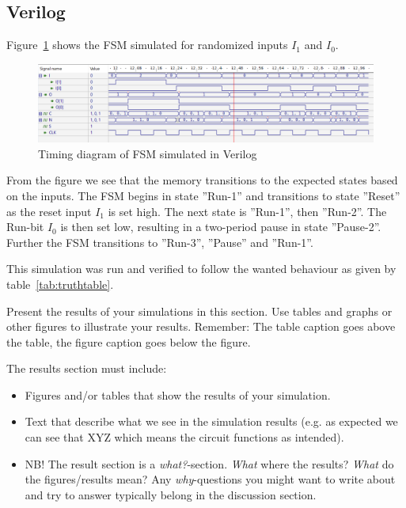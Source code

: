 \subsection{Verilog}

Figure~\ref{fig:fsm_simulation} shows the FSM simulated for randomized inputs $I_1$ and $I_0$.

\begin{figure}[H]
    \centering
    \includegraphics[width=\textwidth]{Figures/Test of FSM.png}
    \caption{Timing diagram of FSM simulated in Verilog}
    \label{fig:fsm_simulation}
\end{figure}

From the figure we see that the memory transitions to the expected states based on the inputs. The FSM begins in state ''Run-1'' and transitions to state ''Reset'' as the reset input $I_1$ is set high. The next state is ''Run-1'', then ''Run-2''. The Run-bit $I_0$ is then set low, resulting in a two-period pause in state ''Pause-2''. Further the FSM transitions to ''Run-3'', ''Pause'' and ''Run-1''.

This simulation was run and verified to follow the wanted behaviour as given by table~\ref{tab:truthtable}.

Present the results of your simulations in this section. Use tables and graphs or other figures to illustrate your results. Remember: The table caption goes above the table, the figure caption goes below the figure.

The results section must include:
\begin{itemize}
    \item Figures and/or tables that show the results of your simulation.
    \item Text that describe what we see in the simulation results (e.g. as expected we can see that XYZ which means the circuit functions as intended).
    \item NB! The result section is a \textit{what?}-section. \textit{What} where the results? \textit{What} do the figures/results mean? Any \textit{why}-questions you might want to write about and try to answer typically belong in the discussion section.
\end{itemize}